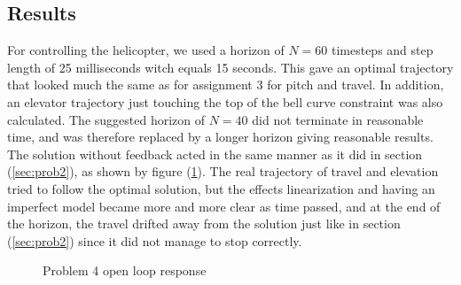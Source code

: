 \subsection{Results}
For controlling the helicopter, we used a horizon of $N=60$ timesteps and step length of 25 milliseconds witch equals 15 seconds. This gave an optimal trajectory that looked much the same as for assignment 3 for pitch and travel. In addition, an elevator trajectory just touching the top of the bell curve constraint was also calculated. The suggested horizon of $N=40$ did not terminate in reasonable time, and was therefore replaced by a longer horizon giving reasonable results. The solution without feedback acted in the same manner as it did in section (\ref{sec:prob2}), as shown by figure (\ref{fig:day4_ol}). The real trajectory of travel and elevation tried to follow the optimal solution, but the effects linearization and having an imperfect model became more and more clear as time passed, and at the end of the horizon, the travel drifted away from the solution just like in section (\ref{sec:prob2}) since it did not manage to stop correctly.

\begin{figure}[htb]
    \centering
    \caption{Problem 4 open loop response}
    \label{fig:day4_ol}
\end{figure}

